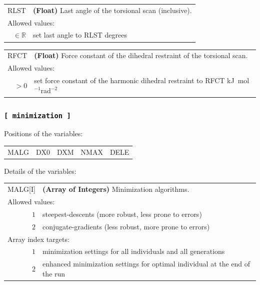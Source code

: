 \documentclass[10pt,a4paper]{report}
\numberwithin{equation}{section}
\begin{document}
{
\begin{tabular}{r@{ : }l}
\label{descr:rlst}
      RLST&\textbf{(Float)} Last angle of the torsional scan (inclusive).                                                        \\ 
\multicolumn{2}{l}{Allowed values:} \\ 
\(\in\mathbb{R}\)&set last angle to RLST degrees                                                                       \\ 
\end{tabular}
\vspace{1ex}
}

{
\begin{tabular}{r@{ : }l}
\label{descr:rfct}
      RFCT&\textbf{(Float)} Force constant of the dihedral restraint of the torsional scan.                                      \\ 
\multicolumn{2}{l}{Allowed values:} \\ 
    \(>0\)&set force constant of the harmonic dihedral restraint to RFCT kJ~mol$^{-1}$rad$^{-2}$                \\ 
\end{tabular}
\vspace{1ex}
}

\subsubsection{\texttt{[~minimization~]}}
\label{sec:inp-minimization}


\noindent Positions of the variables:
\begin{center}
  \begin{tabular}{lllll}
    MALG & DX0 & DXM & NMAX & DELE \\
  \end{tabular}
\end{center}

\noindent Details of the variables:
\vspace{2ex}

{
\begin{tabular}{r@{ : }l}
\label{descr:malg}
      MALG[I]&\textbf{(Array of Integers)} Minimization algorithms.                                                                             \\ 
\multicolumn{2}{l}{Allowed values:} \\ 
     \(1\)&steepest-descents (more robust, less prone to errors)                                                                                    \\ 
     \(2\)&conjugate-gradients (less robust, more prone to errors)                                                                                  \\ 
\multicolumn{2}{l}{Array index targets:} \\ 
     \(1\)&minimization settings for all individuals and all generations \\
     \(2\)&enhanced minimization settings for optimal individual at the end of the run \\
\end{tabular}
\vspace{1ex}
}
\end{document}
